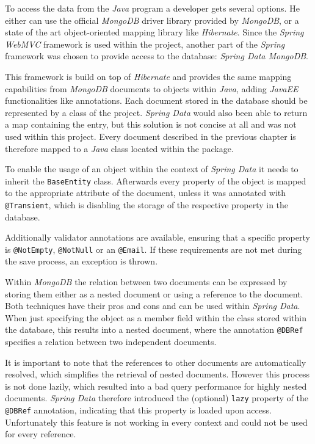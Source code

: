 To access the data from the \emph{Java} program a developer gets several options. He either can use the official \emph{MongoDB} driver library provided by \emph{MongoDB}, or a state of the art object-oriented mapping library like \emph{Hibernate}. Since the \emph{Spring WebMVC} framework is used within the project, another part of the \emph{Spring} framework was chosen to provide access to the database: \emph{Spring Data MongoDB}.

This framework is build on top of \emph{Hibernate} and provides the same mapping capabilities from \emph{MongoDB} documents to objects within \emph{Java}, adding \emph{JavaEE} functionalities like annotations. Each document stored in the database should be represented by a class of the project. \emph{Spring Data} would also been able to return a map containing the entry, but this solution is not concise at all and was not used within this project. Every document described in the previous chapter is therefore mapped to a \emph{Java} class located within the  package. 

To enable the usage of an object within the context of \emph{Spring Data} it needs to inherit the \texttt{BaseEntity} class. Afterwards every property of the object is mapped to the appropriate attribute of the document, unless it was annotated with \texttt{@Transient}, which is disabling the storage of the respective property in the database. 

Additionally validator annotations are available, ensuring that a specific property is \texttt{@NotEmpty}, \texttt{@NotNull} or an \texttt{@Email}. If these requirements are not met during the save process, an exception is thrown. 

Within \emph{MongoDB} the relation between two documents can be expressed by storing them either as a nested document or using a reference to the document. Both techniques have their pros and cons and can be used within \emph{Spring Data}. When just specifying the object as a member field within the class stored within the database, this results into a nested document, where the annotation \texttt{@DBRef} specifies a relation between two independent documents.

It is important to note that the references to other documents are automatically resolved, which simplifies the retrieval of nested documents. However this process is not done lazily, which resulted into a bad query performance for highly nested documents. \emph{Spring Data} therefore introduced the (optional) \texttt{lazy} property of the \texttt{@DBRef} annotation, indicating that this property is loaded upon access. Unfortunately this feature is not working in every context and could not be used for every reference.

